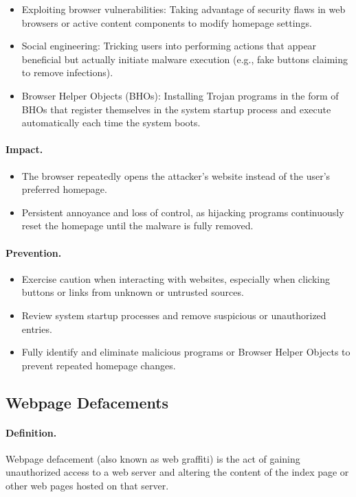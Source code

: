 \begin{itemize}
  \item Exploiting browser vulnerabilities: Taking advantage of security flaws in web browsers or active content components to modify homepage settings.
  \item Social engineering: Tricking users into performing actions that appear beneficial but actually initiate malware execution (e.g., fake buttons claiming to remove infections).
  \item Browser Helper Objects (BHOs): Installing Trojan programs in the form of BHOs that register themselves in the system startup process and execute automatically each time the system boots.
\end{itemize}

\paragraph{Impact.}
\begin{itemize}
  \item The browser repeatedly opens the attacker's website instead of the user's preferred homepage.
  \item Persistent annoyance and loss of control, as hijacking programs continuously reset the homepage until the malware is fully removed.
\end{itemize}

\paragraph{Prevention.}
\begin{itemize}
  \item Exercise caution when interacting with websites, especially when clicking buttons or links from unknown or untrusted sources.
  \item Review system startup processes and remove suspicious or unauthorized entries.
  \item Fully identify and eliminate malicious programs or Browser Helper Objects to prevent repeated homepage changes.
\end{itemize}

\subsection{Webpage Defacements}

\paragraph{Definition.}
Webpage defacement (also known as web graffiti) is the act of gaining unauthorized access to a web server and altering the content of the index page or other web pages hosted on that server.

